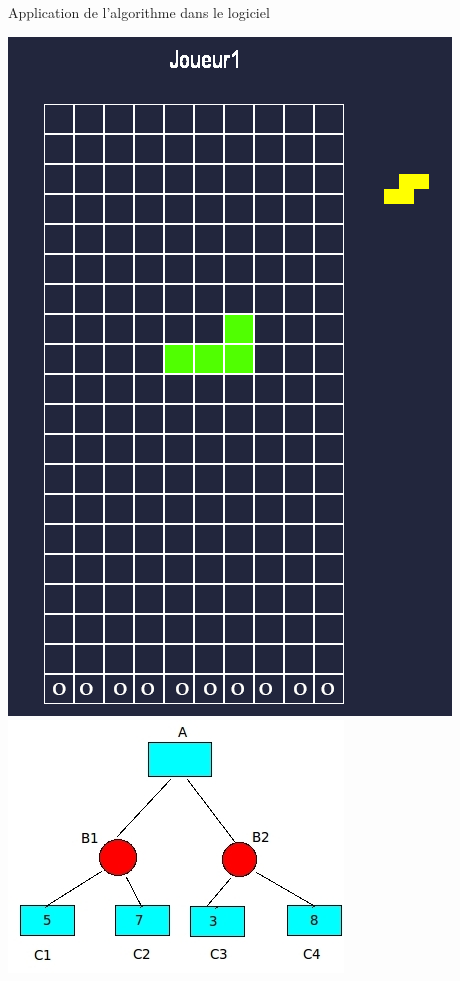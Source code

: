 \documentclass{beamer}
\begin{document}
	

	\begin{frame}{Application de l'algorithme dans le logiciel}

		\includegraphics[scale=0.4]{images/Grille_0.png}\hfill
		\includegraphics[scale=0.4]{images/minmax.jpg}

	\end{frame}
	
\end{document}

